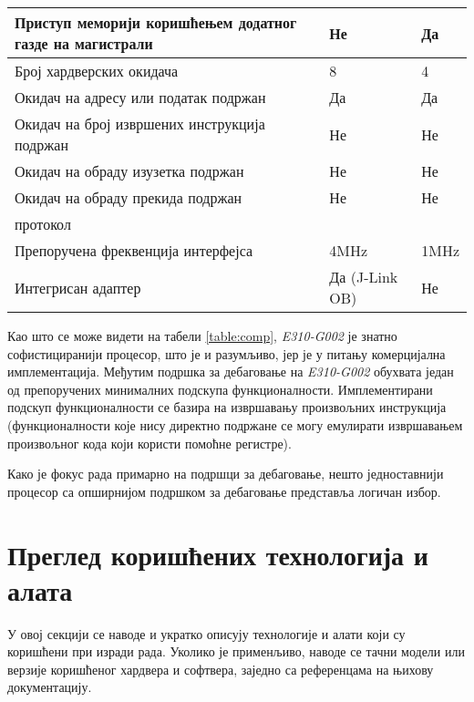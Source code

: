 \begin{table}[h!]
\begin{tabular}{|p{5.5cm}|l|l|}
		\hline Приступ меморији коришћењем додатног газде на магистрали & Не & Да \\
		\hline Број хардверских окидача & 8 & 4 \\
		\hline Окидач на адресу или податак подржан & Да & Да\footnotemark \\
		\hline Окидач на број извршених инструкција подржан & Не & Не \\
		\hline Окидач на обраду изузетка подржан & Не & Не \\
		\hline Окидач на обраду прекида подржан & Не & Не \\
		\hline {}{} протокол & \јтаг{} & {} \\
		\hline Препоручена фреквенција {} интерфејса & 4MHz & 1MHz \\
		\hline Интегрисан {} адаптер & Да (J-Link OB) & Не \\
		\hline
	\end{tabular}
\end{table}


Као што се може видети на табели \ref{table:comp}, \textit{E310-G002} је знатно софистициранији процесор, што је и разумљиво, јер је у питању комерцијална имплементација.
Међутим подршка за дебаговање на \textit{E310-G002} обухвата један од препоручених минималних подскупа функционалности. 
Имплементирани подскуп функционалности се базира на извршавању произвољних инструкција (функционалности које нису директно подржане се могу емулирати извршавањем произвољног кода који користи помоћне регистре).

Како је фокус рада примарно на подршци за дебаговање, нешто једноставнији процесор са опширнијом подршком за дебаговање представља логичан избор.

\section{Преглед коришћених технологија и алата}

У овој секцији се наводе и укратко описују технологије и алати који су коришћени при изради рада.
Уколико је применљиво, наводе се тачни модели или верзије коришћеног хардвера и софтвера, заједно са референцама на њихову документацију.

\subsection{}

